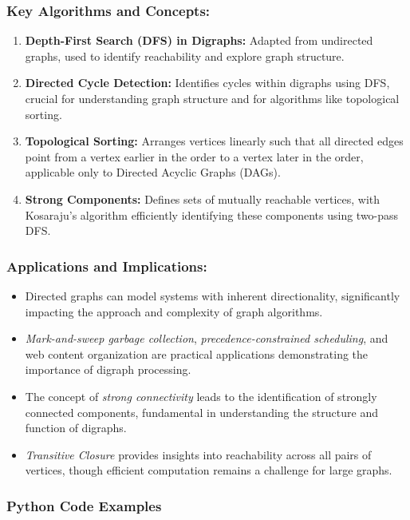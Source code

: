 \documentclass{article}
\begin{document}
\subsubsection{Key Algorithms and Concepts:}
\begin{enumerate}
    \item \textbf{Depth-First Search (DFS) in Digraphs:} Adapted from undirected graphs, used to identify reachability and explore graph structure.
    \item \textbf{Directed Cycle Detection:} Identifies cycles within digraphs using DFS, crucial for understanding graph structure and for algorithms like topological sorting.
    \item \textbf{Topological Sorting:} Arranges vertices linearly such that all directed edges point from a vertex earlier in the order to a vertex later in the order, applicable only to Directed Acyclic Graphs (DAGs).
    \item \textbf{Strong Components:} Defines sets of mutually reachable vertices, with Kosaraju's algorithm efficiently identifying these components using two-pass DFS.
\end{enumerate}

\subsubsection{Applications and Implications:}
\begin{itemize}
    \item Directed graphs can model systems with inherent directionality, significantly impacting the approach and complexity of graph algorithms.
    \item \textit{Mark-and-sweep garbage collection}, \textit{precedence-constrained scheduling}, and web content organization are practical applications demonstrating the importance of digraph processing.
    \item The concept of \textit{strong connectivity} leads to the identification of strongly connected components, fundamental in understanding the structure and function of digraphs.
    \item \textit{Transitive Closure} provides insights into reachability across all pairs of vertices, though efficient computation remains a challenge for large graphs.
\end{itemize}

\subsubsection{Python Code Examples}
\end{document}
